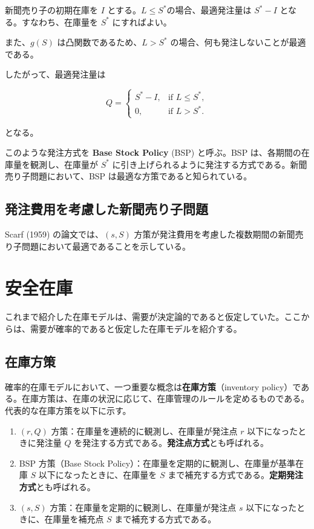 \documentclass[
  japanese,
  letterpaper,
]{ltjbook}
\providecommand{\tightlist}{%
  \setlength{\itemsep}{0pt}\setlength{\parskip}{0pt}}
\theoremstyle{plain}
\theoremstyle{definition}
\theoremstyle{remark}
\begin{document}
新聞売り子の初期在庫を \(I\) とする。\(L \leq S^*\)の場合、最適発注量は
\(S^* - I\) となる。すなわち、在庫量を \(S^*\) にすればよい。

また、\(g(S)\) は凸関数であるため、\(L > S^*\)
の場合、何も発注しないことが最適である。

したがって、最適発注量は

\[
Q =
\begin{cases}
S^* - I, & \text{if } L \le S^*, \\[6pt]
0, & \text{if } L > S^* .
\end{cases}
\]

となる。

このような発注方式を \textbf{Base Stock Policy} (BSP) と呼ぶ。BSP
は、各期間の在庫量を観測し、在庫量が \(S^*\)
に引き上げられるように発注する方式である。新聞売り子問題において、BSP
は最適な方策であると知られている。

\section{発注費用を考慮した新聞売り子問題}\label{ux767aux6ce8ux8cbbux7528ux3092ux8003ux616eux3057ux305fux65b0ux805eux58f2ux308aux5b50ux554fux984c}

Scarf (1959) の論文では、\((s, S)\)
方策が発注費用を考慮した複数期間の新聞売り子問題において最適であることを示している。

\chapter{安全在庫}\label{ux5b89ux5168ux5728ux5eab}

これまで紹介した在庫モデルは、需要が決定論的であると仮定していた。ここからは、需要が確率的であると仮定した在庫モデルを紹介する。

\section{在庫方策}\label{ux5728ux5eabux65b9ux7b56}

確率的在庫モデルにおいて、一つ重要な概念は\textbf{在庫方策}（inventory
policy）である。在庫方策は、在庫の状況に応じて、在庫管理のルールを定めるものである。代表的な在庫方策を以下に示す。

\begin{enumerate}
\def\labelenumi{\arabic{enumi}.}
\tightlist
\item
  \((r, Q)\) 方策：在庫量を連続的に観測し、在庫量が発注点 \(r\)
  以下になったときに発注量 \(Q\)
  を発注する方式である。\textbf{発注点方式}とも呼ばれる。
\item
  BSP 方策（Base Stock
  Policy）：在庫量を定期的に観測し、在庫量が基準在庫 \(S\)
  以下になったときに、在庫量を \(S\)
  まで補充する方式である。\textbf{定期発注方式}とも呼ばれる。
\item
  \((s, S)\) 方策：在庫量を定期的に観測し、在庫量が発注点 \(s\)
  以下になったときに、在庫量を補充点 \(S\) まで補充する方式である。
\end{enumerate}
\end{document}

